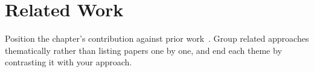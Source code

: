 \section{Related Work}
\label{sec:example-one-related-work}

Position the chapter's contribution against prior
work~\citep{knuth1984literate,lamport1994latex}.  Group related
approaches thematically rather than listing papers one by one, and
end each theme by contrasting it with your approach.
